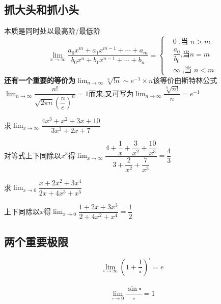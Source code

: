 \documentclass[12pt, a4paper, oneside, UTF8]{ctexbook}
\begin{document}
\begin{sloppypar}
    \subsection{抓大头和抓小头}
    本质是同时处以最高阶/最低阶
    $$
    \lim_{x\to\infty}\dfrac{a_0x^m+a_1x^{m-1}+\cdots+a_m}{b_0x^n+b_1x^{n-1}+\cdots+b_n}=\left.\left\{\begin{aligned}&0\text{ ,当 }n>m\\&\dfrac{a_0}{b_0}\text{,当}n=m\\&\infty\text{ ,当 }n<m\end{aligned}\right.\right.
    $$
    \textbf{还有一个重要的等价为$\lim_{n\to \infty}\sqrt[n]{!n}\sim e^{-1}\times n$}该等价由斯特林公式$\lim_{n\to\infty}\dfrac{n!}{\sqrt{2\pi n}\left(\dfrac ne\right)^n}=1$而来,又可写为\textbf{$\lim_{n\rightarrow\infty}\dfrac{\sqrt[n]{n!}}{n}=e^{-1}$}
    \begin{problem}
        求$\lim_{x\to \infty}\dfrac{4x^3+x^2+3x+10}{3x^3+2x+7}$
    \end{problem}
    \begin{solution}
        对等式上下同除以$x^3$得$\lim_{x \to \infty}\dfrac{4+\dfrac1x+\dfrac3{x^2}+\dfrac{10}{x^3}}{3+\dfrac2{x^2}+\dfrac7{x^3}}=\dfrac{4}{3}$
    \end{solution}
    \begin{problem}
        求$\lim_{x\to 0}\dfrac{x+2x^{2}+3x^{4}}{2x+4x^{3}+x^{5}}$
    \end{problem}
    \begin{solution}
        上下同除以$x$得$\lim_{x\to 0}\dfrac{1+2x+3x^{3}}{2+4x^{2}+x^{4}}=\dfrac{1}{2}$
    \end{solution}
    \subsection{两个重要极限}
    $$
        \lim _ { \square \rightarrow \infty } ( 1 + \dfrac { 1 } { \square } ) ^ { \square } = e
    $$
    \\
    $$
        \lim _ { \square \rightarrow 0 } \dfrac { \sin \square } { \square } = 1
    $$


\end{sloppypar}
\end{document}
